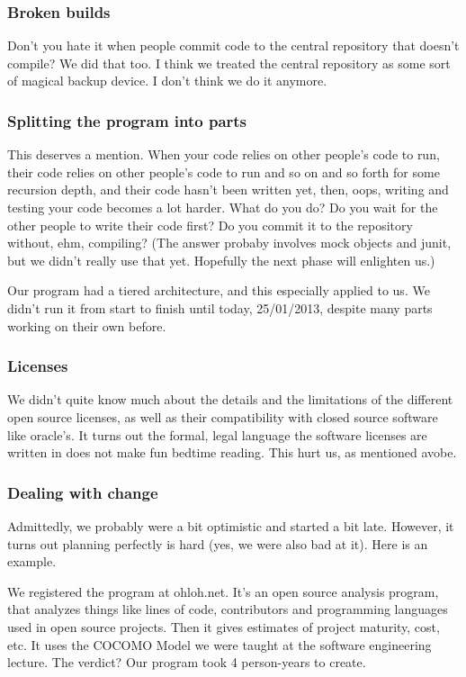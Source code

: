 \subsubsection{Broken builds}
    Don't you hate it when people commit code to the central repository that doesn't compile?
    We did that too. I think we treated the central repository as some sort of magical backup device.
    I don't think we do it anymore.
    
\subsubsection{Splitting the program into parts}
    This deserves a mention. When your code relies on other people's code to run, their code relies on other people's code to run and so on and so forth for some recursion depth, and their code hasn't been written yet, then, oops,
    writing and testing your code becomes a lot harder. What do you do? Do you wait for the other people to write their code first? Do you commit it to the repository without, ehm, compiling?
    (The answer probaby involves mock objects and junit, but we didn't really use that yet. Hopefully the next phase will enlighten us.)
     
    Our program had a tiered architecture, and this especially applied to us. 
    We didn't run it from start to finish until today, 25/01/2013, despite many parts working on their own before.

\subsubsection{Licenses}
    We didn't quite know much about the details and the limitations of the different open source licenses,
    as well as their compatibility with closed source software like oracle's.
    It turns out the formal, legal language the software licenses are written in does not make fun bedtime reading.
    This hurt us, as mentioned avobe.

\subsubsection{Dealing with change}
    Admittedly, we probably were a bit optimistic and started a bit late. However, it turns out planning perfectly is hard (yes, we were also bad at it). Here is an example.
    
    We registered the program at ohloh.net. It's an open source analysis program, that analyzes things like lines of code, contributors and programming languages used in open source projects.
    Then it gives estimates of project maturity, cost, etc.
    It uses the COCOMO Model we were taught at the software engineering lecture.
    The verdict? Our program took 4 person-years to create.
    
